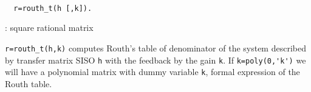 \begin{mandesc}
   \\ %
\end{mandesc}
\begin{calling_sequence}
\begin{verbatim}
  r=routh_t(h [,k]).  
\end{verbatim}
\end{calling_sequence}
\begin{parameters}
  \begin{varlist}
    : square rational matrix
  \end{varlist}
\end{parameters}
\begin{mandescription}
  \verb!r=routh_t(h,k)! computes Routh's table of denominator of the
  system described by transfer matrix SISO \verb!h! with the
  feedback by the gain \verb!k!.
  If  \verb!k=poly(0,'k')! we will have a polynomial matrix with dummy variable 
  \verb!k!, formal expression of the Routh table.
\end{mandescription}

